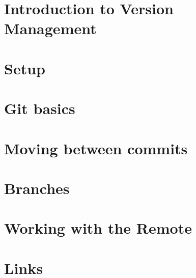 \documentclass[b5paper,openany]{book}
\begin{document}
\tp


\tableofcontents



\chapter{Introduction to Version Management}


\chapter{Setup}


\chapter{Git basics}


\chapter{Moving between commits}


\chapter{Branches}


\chapter{Working with the Remote}


\chapter{Links}





\end{document}
